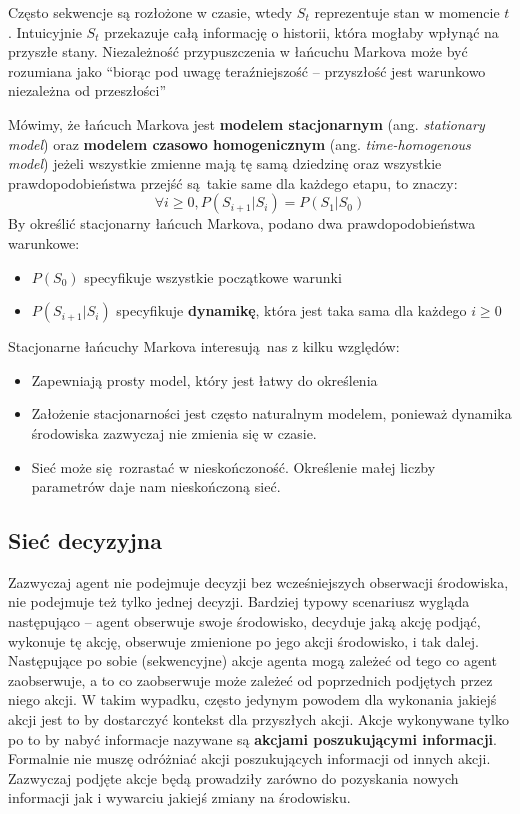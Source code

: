 \documentclass[a4paper, 12pt,oneside]{book}
\begin{document}
Często sekwencje są rozłożone w czasie, wtedy $S_t$ reprezentuje stan w
momencie $t$. Intuicyjnie $S_t$ przekazuje całą informację o historii, która
mogłaby wpłynąć na przyszłe stany. Niezależność przypuszczenia w łańcuchu
Markova może być rozumiana jako ``biorąc pod uwagę teraźniejszość -- przyszłość
jest warunkowo niezależna od przeszłości''

Mówimy, że łańcuch Markova jest \textbf{modelem stacjonarnym} (ang.
\textit{stationary model}) oraz \textbf{modelem czasowo homogenicznym } (ang.
\textit{time-homogenous model}) jeżeli wszystkie zmienne mają tę samą dziedzinę
oraz wszystkie prawdopodobieństwa przejść są takie same dla każdego etapu, to
znaczy:
\[\forall i \ge 0, P(S_{i+1}|S_i) = P(S_1|S_0)\]
By określić stacjonarny łańcuch Markova, podano dwa prawdopodobieństwa
warunkowe:
\begin{itemize}
		\setlength\itemsep{-0.4em}
	\item $P(S_0)$ specyfikuje wszystkie początkowe warunki
	\item $P(S_{i+1} | S_i)$ specyfikuje \textbf{dynamikę}, która jest taka
		sama dla każdego $i \ge 0$
\end{itemize}
Stacjonarne łańcuchy Markova interesują nas z kilku względów:
\begin{itemize}
		\setlength\itemsep{-0.4em}
	\item Zapewniają prosty model, który jest łatwy do określenia
	\item Założenie stacjonarności jest często naturalnym modelem, ponieważ
		dynamika środowiska zazwyczaj nie zmienia się w czasie.
	\item Sieć może się rozrastać w nieskończoność. Określenie małej liczby
		parametrów daje nam nieskończoną
		sieć\cite{ai_foundations_markov_chains}.
\end{itemize}

\subsection{Sieć decyzyjna}
Zazwyczaj agent nie podejmuje decyzji bez wcześniejszych obserwacji środowiska,
nie podejmuje też tylko jednej decyzji. Bardziej typowy scenariusz wygląda
następująco -- agent obserwuje swoje środowisko, decyduje jaką akcję podjąć,
wykonuje tę akcję, obserwuje zmienione po jego akcji środowisko, i tak dalej.
Następujące po sobie (sekwencyjne) akcje agenta mogą zależeć od tego co agent
zaobserwuje, a to co zaobserwuje może zależeć od poprzednich podjętych przez
niego akcji. W takim wypadku, często jedynym powodem dla wykonania jakiejś
akcji jest to by dostarczyć kontekst dla przyszłych akcji. Akcje wykonywane
tylko po to by nabyć informacje nazywane są \textbf{akcjami poszukującymi
informacji}. Formalnie nie muszę odróżniać akcji poszukujących informacji od
innych akcji. Zazwyczaj podjęte akcje będą prowadziły zarówno do pozyskania
nowych informacji jak i wywarciu jakiejś zmiany na środowisku.
\end{document}
